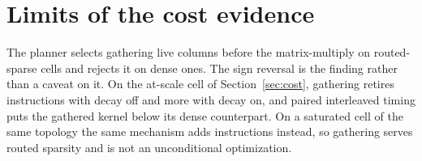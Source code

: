 %
\section{Limits of the cost evidence}
\label{sec:costlimits}
\label{apd:costlimits}

The planner selects gathering live columns before the matrix-multiply on routed-sparse cells and rejects it on dense ones. The sign reversal is the finding rather than a caveat on it. On the at-scale cell of Section~\ref{sec:cost}, gathering retires instructions with decay off and more with decay on, and paired interleaved timing puts the gathered kernel below its dense counterpart. On a saturated cell of the same topology the same mechanism adds instructions instead, so gathering serves routed sparsity and is not an unconditional optimization. 

